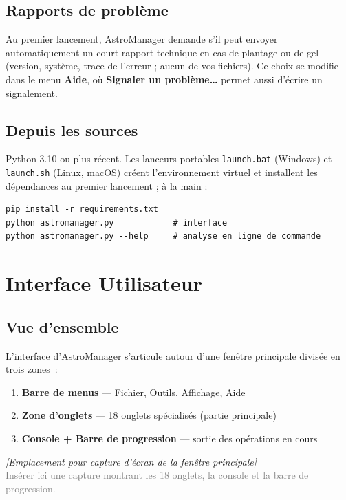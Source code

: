 \documentclass[a4paper,11pt]{article}
\newcommand{\menu}[1]{\textsf{\textbf{\textcolor{sky}{#1}}}}
\begin{document}
\subsection{Rapports de problème}

Au premier lancement, AstroManager demande s'il peut envoyer automatiquement un
court rapport technique en cas de plantage ou de gel (version, système, trace de
l'erreur ; aucun de vos fichiers). Ce choix se modifie dans le menu \menu{Aide},
où \menu{Signaler un problème\dots} permet aussi d'écrire un signalement.

\subsection{Depuis les sources}

Python 3.10 ou plus récent. Les lanceurs portables \texttt{launch.bat} (Windows)
et \texttt{launch.sh} (Linux, macOS) créent l'environnement virtuel et installent
les dépendances au premier lancement ; à la main :

\begin{lstlisting}
pip install -r requirements.txt
python astromanager.py            # interface
python astromanager.py --help     # analyse en ligne de commande
\end{lstlisting}

\section{Interface Utilisateur}
\label{sec:interface}

\subsection{Vue d'ensemble}

L'interface d'AstroManager s'articule autour d'une fen\^{e}tre principale divis\'{e}e en trois zones~:

\begin{enumerate}
    \item \textbf{Barre de menus} --- Fichier, Outils, Affichage, Aide
    \item \textbf{Zone d'onglets} --- 18 onglets sp\'{e}cialis\'{e}s (partie principale)
    \item \textbf{Console + Barre de progression} --- sortie des op\'{e}rations en cours
\end{enumerate}

\begin{center}
\begin{tcolorbox}[
    enhanced, width=14cm,
    colback=bgdark!3, colframe=mainblue!40,
    arc=5pt, boxrule=0.5pt,
    halign=center
]
\textit{[Emplacement pour capture d'\'{e}cran de la fen\^{e}tre principale]}\\[0.3cm]
\small\textcolor{gray}{Ins\'{e}rer ici une capture montrant les 18 onglets, la console et la barre de progression.}
\end{tcolorbox}
\end{center}
\end{document}

